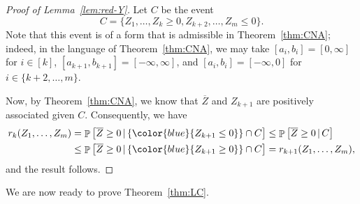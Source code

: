 \documentclass[12pt,english,reqno]{amsart}
\theoremstyle{plain}
\theoremstyle{remark}
\numberwithin{figure}{section}
\numberwithin{equation}{section}
\def\bZ{\overline{Z}}
\DeclareMathOperator{\Pb}{\mathbb{P}} %
\def\ar{r} %
\begin{document}
\begin{proof}[Proof of Lemma~\ref{lem:red-Y}]
	Let $C$ be the event
	\[ C = \{ Z_1,\dots, Z_k \geq 0, Z_{k+2}, \dots, Z_m \leq 0 \}. \]
	Note that this event is of a form that is admissible in Theorem~\ref{thm:CNA}; indeed, in the language of Theorem~\ref{thm:CNA}, we may take $[a_i,b_i]=[0,\infty]$ for $i \in [k]$, $[a_{k+1},b_{k+1}]=[-\infty,\infty]$, and $[a_i,b_i]=[-\infty,0]$ for $i \in \{k+2,\dots, m\}$.

	Now, by Theorem~\ref{thm:CNA}, we know that $\bZ$ and $Z_{k+1}$ are positively associated given $C$. Consequently, we have
	\begin{align*}
		\ar_k(Z_1,\dots, Z_m) & = \Pb\left[ \bZ \geq 0 \, \vert \, \{{\color{blue}{Z_{k+1}\leq 0}} \} \cap C\right] \leq \Pb\left[ \bZ \geq 0 \,\vert\, C\right] \\
		                      & \leq \Pb\left[ \bZ \geq 0 \, \vert \, \{{\color{blue}{Z_{k+1}\geq 0}} \} \cap C\right]= \ar_{k+1}(Z_1,\dots, Z_m),
	\end{align*}
	and the result follows.
\end{proof}

We are now ready to prove Theorem~\ref{thm:LC}.
\end{document}
